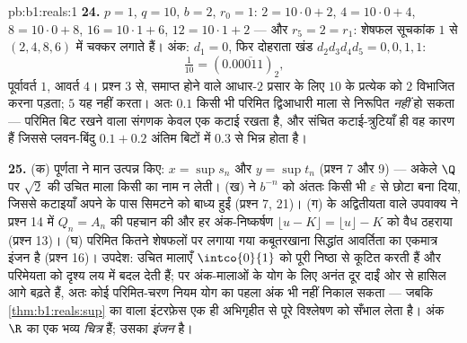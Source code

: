 \begin{solution}{pb:b1:reals:1}
\textbf{24.} $p = 1$, $q = 10$, $b = 2$, $r_0 = 1$: $2 = 10 \cdot 0 + 2$, $4
= 10 \cdot 0 + 4$, $8 = 10 \cdot 0 + 8$, $16 = 10 \cdot 1 + 6$, $12 = 10
\cdot 1 + 2$ --- और $r_5 = 2 = r_1$: शेषफल सूचकांक $1$ से $(2, 4, 8, 6)$ में
चक्कर लगाते हैं। अंक: $d_1 = 0$, फिर दोहराता खंड $d_2 d_3 d_4 d_5 = 0, 0, 1,
1$:
\[
\tfrac{1}{10} = (0.0\overline{0011})_2 ,
\]
पूर्वावर्त $1$, आवर्त $4$। प्रश्न 3 से, समाप्त होने वाले आधार-$2$ प्रसार के
लिए $10$ के प्रत्येक  को $2$ विभाजित करना पड़ता;  $5$ यह नहीं
करता। अतः $0.1$ किसी भी परिमित द्विआधारी माला से निरूपित \emph{नहीं} हो सकता
--- परिमित बिट रखने वाला संगणक केवल एक कटाई रखता है, और संचित कटाई-त्रुटियाँ
ही वह कारण हैं जिससे प्लवन-बिंदु $0.1 + 0.2$ अंतिम बिटों में $0.3$ से भिन्न
होता है।

\textbf{25.} (क) पूर्णता ने मान उत्पन्न किए: $x = \sup s_n$ और $y = \sup
t_n$ (प्रश्न 7 और 9) --- अकेले $\Q$ पर $\sqrt 2$ की उचित माला किसी का नाम न
लेती। (ख)  ने $b^{-n}$ को अंततः किसी भी $\varepsilon$ से
छोटा बना दिया, जिससे कटाइयाँ अपने  के पास सिमटने को बाध्य हुईं (प्रश्न
7, 21)। (ग)  के अद्वितीयता वाले उपवाक्य ने प्रश्न 14 में $Q_n = A_n$ की
पहचान की और हर अंक-निष्कर्षण $\lfloor u - K \rfloor = \lfloor u \rfloor - K$
को वैध ठहराया (प्रश्न 13)। (घ) परिमित कितने शेषफलों पर लगाया गया कबूतरखाना
सिद्धांत आवर्तिता का एकमात्र इंजन है (प्रश्न 16)। उपदेश: उचित मालाएँ
$\intco{0}{1}$ को पूरी निष्ठा से कूटित करती हैं और परिमेयता को दृश्य लय में
बदल देती हैं; पर अंक-मालाओं के योग के लिए अनंत दूर दाईं ओर से हासिल आगे
बढ़ते हैं, अतः कोई परिमित-चरण नियम योग का पहला अंक भी नहीं निकाल सकता ---
जबकि \cref{thm:b1:reals:sup} का  वाला इंटरफ़ेस एक ही अभिगृहीत से पूरे
विश्लेषण को सँभाल लेता है। अंक $\R$ का एक भव्य \emph{चित्र} हैं;  उसका
\emph{इंजन} है।
\end{solution}
